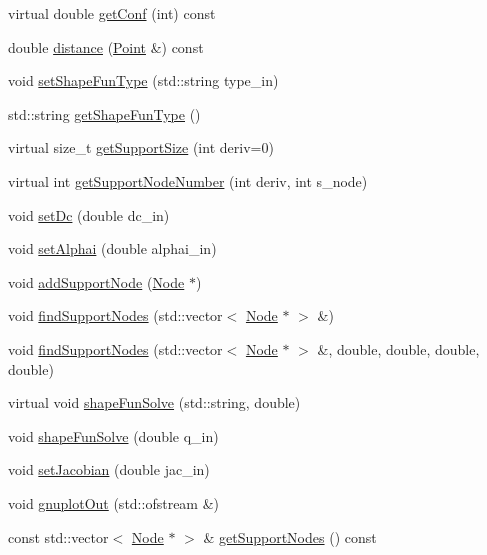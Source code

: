 \begin{DoxyCompactItemize}
\item 
virtual double \hyperlink{classmknix_1_1_point_a8bfbde170c041c55d7e31f596701c977}{get\+Conf} (int) const 
\item 
double \hyperlink{classmknix_1_1_point_a138d3c418c3147aead7f3958f1db9b42}{distance} (\hyperlink{classmknix_1_1_point}{Point} \&) const 
\item 
void \hyperlink{classmknix_1_1_point_ac8cc95650eac1e676c11f2874d899a7b}{set\+Shape\+Fun\+Type} (std\+::string type\+\_\+in)
\item 
std\+::string \hyperlink{classmknix_1_1_point_af432e99d48f5db21728db72ec0d49025}{get\+Shape\+Fun\+Type} ()
\item 
virtual size\+\_\+t \hyperlink{classmknix_1_1_point_aa60786832d373fd1f8017fdf826a7a4b}{get\+Support\+Size} (int deriv=0)
\item 
virtual int \hyperlink{classmknix_1_1_point_a64039f7f478db03bdfa481bd525d2c45}{get\+Support\+Node\+Number} (int deriv, int s\+\_\+node)
\item 
void \hyperlink{classmknix_1_1_point_abf06bbd55297ab42ecf0ef49a258ad09}{set\+Dc} (double dc\+\_\+in)
\item 
void \hyperlink{classmknix_1_1_point_aeed553d37db81fa6f7ea08834ec98724}{set\+Alphai} (double alphai\+\_\+in)
\item 
void \hyperlink{classmknix_1_1_point_a41f06a5ee1993d52db1c629a1ab8ae3f}{add\+Support\+Node} (\hyperlink{classmknix_1_1_node}{Node} $\ast$)
\item 
void \hyperlink{classmknix_1_1_point_a88289f6649c16591f708e2a6f5eb749e}{find\+Support\+Nodes} (std\+::vector$<$ \hyperlink{classmknix_1_1_node}{Node} $\ast$ $>$ \&)
\item 
void \hyperlink{classmknix_1_1_point_a13907374f703f15ffda3bb376bd19073}{find\+Support\+Nodes} (std\+::vector$<$ \hyperlink{classmknix_1_1_node}{Node} $\ast$ $>$ \&, double, double, double, double)
\item 
virtual void \hyperlink{classmknix_1_1_point_a1843d81646fbca9519358eb3c8787e18}{shape\+Fun\+Solve} (std\+::string, double)
\item 
void \hyperlink{classmknix_1_1_point_a71d8bc7ab41357fafbacae3b85a6b0a5}{shape\+Fun\+Solve} (double q\+\_\+in)
\item 
void \hyperlink{classmknix_1_1_point_aea25863c7bab8e63c09ca394546a5502}{set\+Jacobian} (double jac\+\_\+in)
\item 
void \hyperlink{classmknix_1_1_point_ad985b1bb6595c64f6bfc60b557e86ec9}{gnuplot\+Out} (std\+::ofstream \&)
\item 
const std\+::vector$<$ \hyperlink{classmknix_1_1_node}{Node} $\ast$ $>$ \& \hyperlink{classmknix_1_1_point_ad55ff02be90bf3c604dc5543fed2a5ab}{get\+Support\+Nodes} () const 
\end{DoxyCompactItemize}
